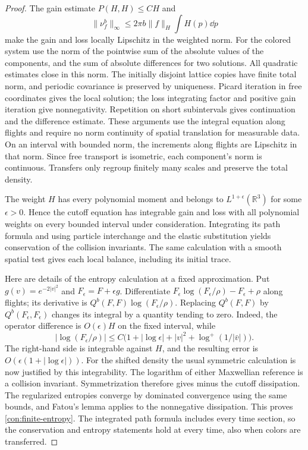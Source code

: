 \begin{proof}
The gain estimate \(P(H,H)\le CH\) and
\[
 \|\nu_f^b\|_\infty\le
  2\pi b\|f\|_H\int H(p)\dd p
\]
make the gain and loss locally Lipschitz in the weighted norm.
For the colored system use the norm of the pointwise sum of the
absolute values of the components, and the sum of absolute differences
for two solutions.  All quadratic estimates close in this norm.
The initially disjoint lattice copies have finite total norm, and
periodic covariance is preserved by uniqueness.  Picard iteration in
free coordinates gives the local solution; the loss integrating factor
and positive gain iteration give nonnegativity.  Repetition on short
subintervals gives continuation and the difference estimate.  These
arguments use the integral equation along flights and require no norm
continuity of spatial translation for measurable data.  On an interval
with bounded norm, the increments along flights are Lipschitz in that
norm.  Since free transport is isometric, each component's norm is
continuous.  Transfers only regroup finitely many scales and preserve
the total density.

The weight \(H\) has every polynomial moment and belongs to
\(L^{1+\epsilon}(\mathbb R^3)\) for some \(\epsilon>0\).  Hence the
cutoff equation has integrable gain and loss with all polynomial
weights on every bounded interval under consideration.  Integrating
its path formula and using particle interchange and the elastic
substitution yields conservation of the collision invariants.  The
same calculation with a smooth spatial test gives each local balance,
including its initial trace.

Here are details of the entropy calculation at a fixed approximation.
Put \(g(v)=e^{-2|v|^2}\) and \(F_\epsilon=F+\epsilon g\).  Differentiate
\(F_\epsilon\log(F_\epsilon/\rho)-F_\epsilon+\rho\) along flights;
its derivative is \(Q^b(F,F)\log(F_\epsilon/\rho)\).
Replacing \(Q^b(F,F)\) by \(Q^b(F_\epsilon,F_\epsilon)\) changes its
integral by a quantity tending to zero.  Indeed, the operator difference
is \(O(\epsilon)H\) on the fixed interval, while
\[
 |\log(F_\epsilon/\rho)|
 \le C\bigl(1+|\log\epsilon|+|v|^2+
                           \log^+(1/|\bar v|)\bigr).
\]
The right-hand side is integrable against \(H\), and the resulting
error is \(O(\epsilon(1+|\log\epsilon|))\).
For the shifted density the usual symmetric calculation is now
justified by this integrability.  The logarithm of either Maxwellian
reference is a collision invariant.  Symmetrization therefore gives
minus the cutoff dissipation.  The regularized entropies converge by
dominated convergence using the same bounds, and Fatou's lemma applies
to the nonnegative dissipation.  This proves
\eqref{con:finite-entropy}.  The integrated path formula includes every
time section, so the conservation and entropy statements hold at every
time, also when colors are transferred.
\end{proof}

